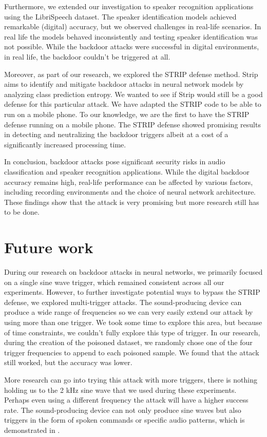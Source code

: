 \documentclass{report}
\theoremstyle{definition}
\theoremstyle{remark}
\begin{document}
Furthermore, we extended our investigation to speaker recognition applications using the LibriSpeech dataset. The speaker identification models achieved remarkable (digital) accuracy, but we observed challenges in real-life scenarios. In real life the models behaved inconsistently and testing speaker identification was not possible. While the backdoor attacks were successful in digital environments, in real life, the backdoor couldn't be triggered at all.

Moreover, as part of our research, we explored the STRIP defense method. Strip aims to identify and mitigate backdoor attacks in neural network models by analyzing class prediction entropy. We wanted to see if Strip would still be a good defense for this particular attack. We have adapted the STRIP code to be able to run on a mobile phone. To our knowledge, we are the first to have the STRIP defense running on a mobile phone. The STRIP defense showed promising results in detecting and neutralizing the backdoor triggers albeit at a cost of a significantly increased processing time.

In conclusion, backdoor attacks pose significant security risks in audio classification and speaker recognition applications. While the digital backdoor accuracy remains high, real-life performance can be affected by various factors, including recording environments and the choice of neural network architecture. These findings show that the attack is very promising but more research still has to be done.

\chapter{Future work}
During our research on backdoor attacks in neural networks, we primarily focused on a single sine wave trigger, which remained consistent across all our experiments. However, to further investigate potential ways to bypass the STRIP defense, we explored multi-trigger attacks. The sound-producing device can produce a wide range of frequencies so we can very easily extend our attack by using more than one trigger. We took some time to explore this area, but because of time constraints, we couldn't fully explore this type of trigger. In our research, during the creation of the poisoned dataset, we randomly chose one of the four trigger frequencies to append to each poisoned sample. We found that the attack still worked, but the accuracy was lower. 

More research can go into trying this attack with more triggers, there is nothing holding us to the 2 kHz sine wave that we used during these experiments. Perhaps even using a different frequency the attack will have a higher success rate. The sound-producing device can not only produce sine waves but also triggers in the form of spoken commands or specific audio patterns, which is demonstrated in \cite{POSTER} \cite{DOLPHIN}. 
\end{document}
